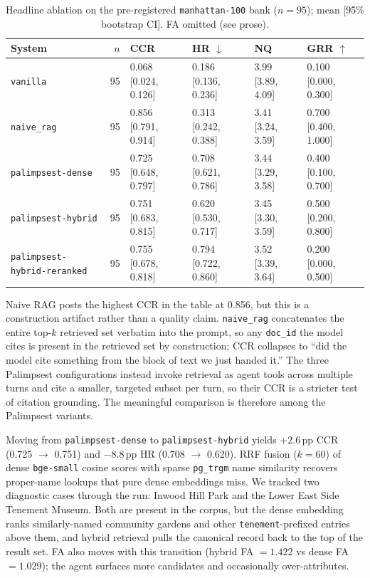 \documentclass[sigconf,nonacm]{acmart}
\begin{document}
\begin{table}[t]
  \caption{Headline ablation on the pre-registered \texttt{manhattan-100} bank ($n=95$); mean [95\% bootstrap CI]. FA omitted (see prose).}
  \label{tab:ablation}
  \small
  \begin{tabular}{l r l l l l}
    \toprule
    System & $n$ & CCR & HR $\downarrow$ & NQ & GRR $\uparrow$ \\
    \midrule
    \texttt{vanilla} & 95 & 0.068 [0.024, 0.126] & 0.186 [0.136, 0.236] & 3.99 [3.89, 4.09] & 0.100 [0.000, 0.300] \\
    \texttt{naive\_rag} & 95 & 0.856 [0.791, 0.914] & 0.313 [0.242, 0.388] & 3.41 [3.24, 3.59] & 0.700 [0.400, 1.000] \\
    \texttt{palimpsest-dense} & 95 & 0.725 [0.648, 0.797] & 0.708 [0.621, 0.786] & 3.44 [3.29, 3.58] & 0.400 [0.100, 0.700] \\
    \texttt{palimpsest-hybrid} & 95 & 0.751 [0.683, 0.815] & 0.620 [0.530, 0.717] & 3.45 [3.30, 3.59] & 0.500 [0.200, 0.800] \\
    \texttt{palimpsest-hybrid-\allowbreak reranked} & 95 & 0.755 [0.678, 0.818] & 0.794 [0.722, 0.860] & 3.52 [3.39, 3.64] & 0.200 [0.000, 0.500] \\
    \bottomrule
  \end{tabular}
\end{table}

Naive RAG posts the highest CCR in the table at 0.856, but this is a construction artifact rather than a quality claim. \texttt{naive\_rag} concatenates the entire top-$k$ retrieved set verbatim into the prompt, so any \texttt{doc\_id} the model cites is present in the retrieved set by construction; CCR collapses to ``did the model cite something from the block of text we just handed it.'' The three Palimpsest configurations instead invoke retrieval as agent tools across multiple turns and cite a smaller, targeted subset per turn, so their CCR is a stricter test of citation grounding. The meaningful comparison is therefore among the Palimpsest variants.

Moving from \texttt{palimpsest-dense} to \texttt{palimpsest-hybrid} yields $+2.6\,\mathrm{pp}$ CCR (0.725 $\to$ 0.751) and $-8.8\,\mathrm{pp}$ HR (0.708 $\to$ 0.620). RRF fusion ($k=60$) of dense \texttt{bge-small} cosine scores with sparse \texttt{pg\_trgm} name similarity recovers proper-name lookups that pure dense embeddings miss. We tracked two diagnostic cases through the run: Inwood Hill Park and the Lower East Side Tenement Museum. Both are present in the corpus, but the dense embedding ranks similarly-named community gardens and other \texttt{tenement}-prefixed entries above them, and hybrid retrieval pulls the canonical record back to the top of the result set. FA also moves with this transition (hybrid FA $= 1.422$ vs dense FA $= 1.029$); the agent surfaces more candidates and occasionally over-attributes.
\end{document}
